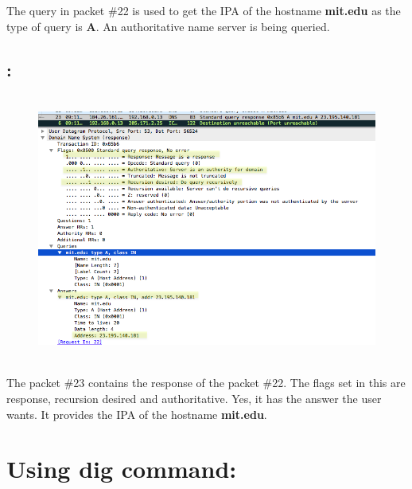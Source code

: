 \documentclass[]{report}
\begin{document}
The query in packet \#22 is used to get the IPA of the hostname \textbf{mit.edu}  as the type of query is \textbf{A}. An authoritative name server is being queried. 

\subsection{:}
\begin{figure}[H]
	\vspace{0pt}
	\includegraphics[height = 250pt, keepaspectratio]{Snapshots/q3/3_10.png}
\end{figure}

The packet \#23 contains the response of the packet \#22. The flags set in this are response, recursion desired and authoritative. Yes, it has the answer the user wants. It provides the IPA of the hostname \textbf{mit.edu}.

\section{Using dig command:}
\end{document}
